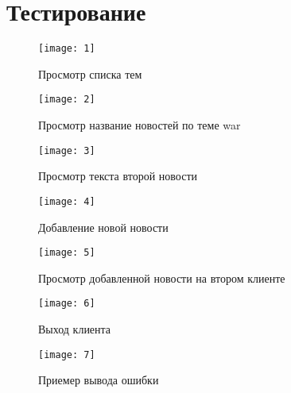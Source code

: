 \section{Тестирование}

\begin{figure}[H]
	\begin{center}
		\texttt{[image: 1]}
		\caption{Просмотр списка тем} 
		\label{pic:pic_name} %
	\end{center}
\end{figure}

\begin{figure}[H]
	\begin{center}
		\texttt{[image: 2]}
		\caption{Просмотр название новостей по теме war} 
		\label{pic:pic_name} %
	\end{center}
\end{figure}

\begin{figure}[H]
	\begin{center}
		\texttt{[image: 3]}
		\caption{Просмотр текста второй новости} 
		\label{pic:pic_name} %
	\end{center}
\end{figure}

\begin{figure}[H]
	\begin{center}
		\texttt{[image: 4]}
		\caption{Добавление новой новости} 
		\label{pic:pic_name} %
	\end{center}
\end{figure}

\begin{figure}[H]
	\begin{center}
		\texttt{[image: 5]}
		\caption{Просмотр добавленной новости на втором клиенте} 
		\label{pic:pic_name} %
	\end{center}
\end{figure}

\begin{figure}[H]
	\begin{center}
		\texttt{[image: 6]}
		\caption{Выход клиента} 
		\label{pic:pic_name} %
	\end{center}
\end{figure}

\begin{figure}[H]
	\begin{center}
		\texttt{[image: 7]}
		\caption{Приемер вывода ошибки} 
		\label{pic:pic_name} %
	\end{center}
\end{figure}


